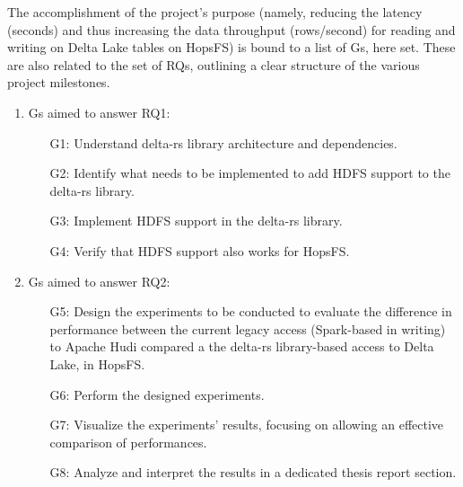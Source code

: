 The accomplishment of the project's purpose (namely, reducing the latency (seconds) and thus increasing the data throughput (rows/second) for reading and writing on Delta Lake tables on \gls{HopsFS}) is bound to a list of \glspl{G}, here set. These are also related to the set of \glspl{RQ}, outlining a clear structure of the various project milestones.

\begin{enumerate}
    \item \glspl{G} aimed to answer RQ1: 
        \begin{enumerate}
            \item[G1:] Understand delta-rs library architecture and dependencies.
            \item[G2:] Identify what needs to be implemented to add \gls{HDFS} support to the delta-rs library.  
            \item[G3:] Implement \gls{HDFS} support in the delta-rs library.
            \item[G4:] Verify that \gls{HDFS} support also works for \gls{HopsFS}.
        \end{enumerate}
    \item \glspl{G} aimed to answer RQ2:
        \begin{enumerate}
            \item[G5:] Design the experiments to be conducted to evaluate the difference in performance between the current legacy access (Spark-based in writing) to Apache Hudi compared a the delta-rs library-based access to Delta Lake, in \gls{HopsFS}. 
            \item[G6:] Perform the designed experiments.
            \item[G7:] Visualize the experiments' results, focusing on allowing an effective comparison of performances.
            \item[G8:] Analyze and interpret the results in a dedicated thesis report section.
        \end{enumerate}
\end{enumerate}

